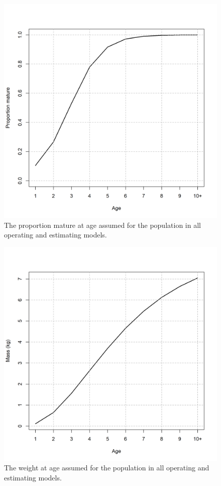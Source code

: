 \documentclass[
  12pt,
]{article}
\begin{document}
\begin{figure}
\caption{The proportion mature at age assumed for the population in all operating and estimating models.}\label{om_maturity}
\begin{center}
\includegraphics[width = \textwidth]{om_maturity.png}
\end{center}
\end{figure}

\begin{figure}
\caption{The weight at age assumed for the population in all operating and estimating models.}\label{om_waa}
\begin{center}
\includegraphics[width = \textwidth]{om_waa.png}
\end{center}
\end{figure}
\end{document}
